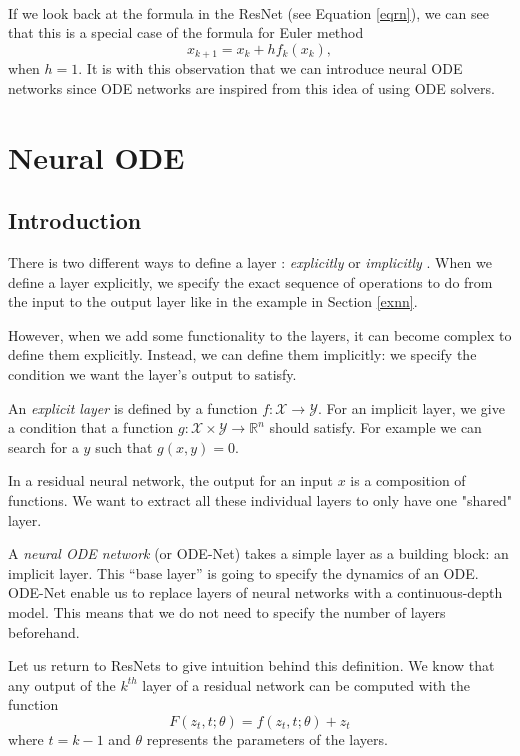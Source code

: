 \documentclass[10pt,a4paper]{article}
\theoremstyle{definition}
\theoremstyle{plain}
\begin{document}
~

If we look back at the formula in the ResNet (see Equation \ref{eqrn}), we can see that this is a special case of the formula for Euler method
\begin{equation*}
x_{k+1} = x_k + hf_k(x_k),
\end{equation*}
when $h = 1$. It is with this observation that we can introduce neural ODE networks since ODE networks are inspired from this idea of using ODE solvers.

\section{Neural ODE} \label{neuralode}

\subsection{Introduction}

There is two different ways to define a layer : \textit{explicitly} or \textit{implicitly} \cite{2}. When we define a layer explicitly, we specify the exact sequence of operations to do from the input to the output layer like in the example in Section \ref{exnn}. 

However, when we add some functionality to the layers, it can become complex to define them explicitly. Instead, we can define them implicitly: we specify the condition we want the layer's output to satisfy. 

An \textit{explicit layer} is defined by a function $f : \mathcal{X} \rightarrow \mathcal{Y}$. For an implicit layer, we give a condition that a function $g: \mathcal{X} \times \mathcal{Y} \rightarrow \mathbb{R}^n$ should satisfy. For example we can search for a $y$ such that $g(x,y) = 0$.

In a residual neural network, the output for an input $x$ is a composition of functions. We want to extract all these individual layers to only have one "shared" layer.

A \textit{neural ODE network} (or ODE-Net) \cite{2,3,12} takes a simple layer as a building block: an implicit layer. This “base layer” is going to specify the dynamics of an ODE.
ODE-Net enable us to replace layers of neural networks with a continuous-depth model. This means that we do not need to specify the number of layers beforehand.

Let us return to ResNets to give intuition behind this definition. We know that any output of the $k^{th}$ layer of a residual network can be computed with the function
\begin{equation*}
F(z_t, t; \theta) = f(z_t, t;\theta) + z_t
\end{equation*}
where $t = k - 1$ and $\theta$ represents the parameters of the layers.
\end{document}

